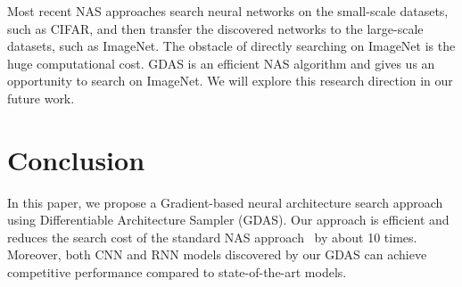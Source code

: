 \documentclass[10pt,twocolumn,letterpaper]{article}
\begin{document}
Most recent NAS approaches search neural networks on the small-scale datasets, such as CIFAR, and then transfer the discovered networks to the large-scale datasets, such as ImageNet. The obstacle of directly searching on ImageNet is the huge computational cost. GDAS is an efficient NAS algorithm and gives us an opportunity to search on ImageNet. We will explore this research direction in our future work.





\section{Conclusion}

In this paper, we propose a Gradient-based neural architecture search approach using Differentiable Architecture Sampler (GDAS).
Our approach is efficient and reduces the search cost of the standard NAS approach~\cite{Zoph_2018_CVPR} by about 10 times.
Moreover, both CNN and RNN models discovered by our GDAS can achieve competitive performance compared to state-of-the-art models.

{\small


}
\end{document}
